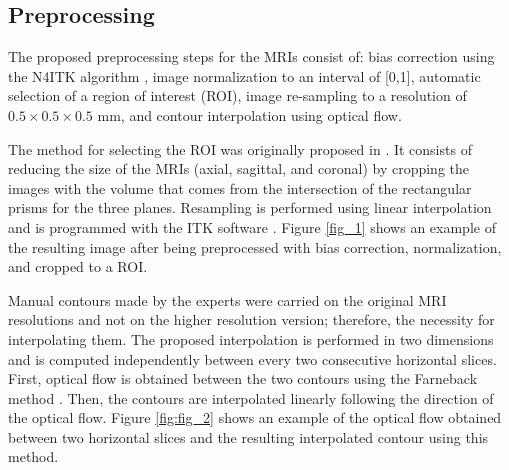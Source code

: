\subsection{Preprocessing}
\label{subsec:prepro}
The proposed preprocessing steps for the MRIs consist of: bias correction using the N4ITK algorithm \cite{n4itk}, image normalization to an interval of [0,1], automatic selection of a region of interest (ROI), image re-sampling to a resolution of $0.5 \times 0.5 \times 0.5$ mm, and contour interpolation using optical flow.  

The method for selecting the ROI was originally proposed in \cite{anneke}. It consists of reducing the size of the MRIs (axial, sagittal, and coronal) by cropping the images with the volume that comes from the intersection of the rectangular prisms for the three planes. Resampling is performed using linear interpolation and is programmed with the ITK software \cite{itk}.  Figure \ref{fig_1} shows an example of the resulting image after being preprocessed with bias correction, normalization, and cropped to a ROI. 


Manual contours made by the experts were carried on the original MRI resolutions and not on the higher resolution version; therefore, the necessity for interpolating them.  The proposed interpolation is performed in two dimensions and is computed independently between every two consecutive horizontal slices. First, optical flow is obtained between the two contours using the Farneback method \cite{optflow}. Then, the contours are interpolated linearly following the direction of the optical flow. Figure \ref{fig:fig_2} shows an example of the optical flow obtained between two horizontal slices and the resulting interpolated contour using this method. 


